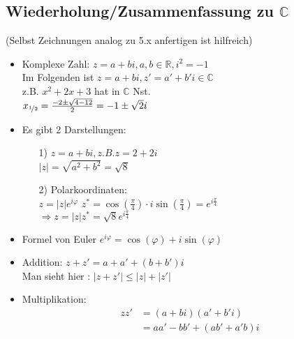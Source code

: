 \documentclass[a4paper, 12pt,titlepage, pdf, headsepline]{scrartcl}
\newcommand{\R}{\mathds{R}}
\newcommand{\C}{\mathds{C}}
\renewcommand{\>}{\rightarrow}
\renewcommand{\*}{\cdot}
\renewcommand{\phi}{\varphi}
\begin{document}
		      			\subsection{Wiederholung/Zusammenfassung zu $\C$}
		      			(Selbst Zeichnungen analog zu 5.x anfertigen ist hilfreich)
		      			\begin{itemize}
		      				\item Komplexe Zahl: $z = a +bi, a,b \in \R, i^2 = -1$\\
		      				      Im Folgenden ist $z = a +bi, z' = a' + b'i \in \C$\\
		      				      z.B. $x^2 + 2x +3$ hat in $\C$ Nst.\\
		      				      $x_{\nicefrac{1}{2}} = \frac{-2 \pm \sqrt{4-12}}{2} = -1 \pm \sqrt{2}i$\\
		      				\item Es gibt 2 Darstellungen: \\		
		      				      \begin{itemize}
		      				      	\item[1)]
		      				      	      $z = a +bi, z.B. z = 2 + 2i$\\
		      				      	      $|z| = \sqrt{a^2 + b^2} = \sqrt{8}$
		      				      	\item[2)]
		      				      	      Polarkoordinaten: \\
		      				      	      $z = |z| e^{i\phi}$
		      				      	      $z^* = \cos(\frac{\pi}{4}) \cdot i \sin(\frac{\pi}{4}) = e^{i\frac{\pi}{4}}$ \\
		      				      	      $\Rightarrow z = |z| z^* = \sqrt{8} e^{i\frac{\pi}{4}}$
		      				      \end{itemize} 
		      				\item Formel von Euler $e^{i\phi} = \cos(\phi) + i \sin(\phi)$
		      				\item Addition: $z + z' = a +a' + (b+ b')i$ \\
		      				      Man sieht hier : $ |z + z'| \leq |z| + |z'|$
		      				\item Multiplikation: 
		      				      \begin{align*}
		      				      	zz' & = (a + bi)(a'+b'i)             \\
		      				      	    & = aa' - bb'+(ab'+a'b)i         \\

\end{align*}
\end{itemize}
\end{document}
